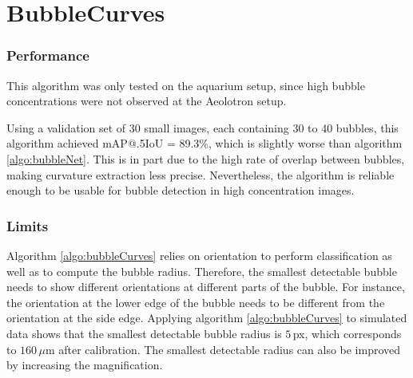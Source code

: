 			\section{BubbleCurves}\label{result_curves}
			
				\subsubsection{Performance}
				This algorithm was only tested on the aquarium setup, since high bubble concentrations were not observed at the Aeolotron setup. 
				
				Using a validation set of 30 small images, each containing 30 to 40 bubbles, this algorithm achieved mAP@.5IoU = 89.3\%, which is slightly worse than algorithm \ref{algo:bubbleNet}. This is in part due to the high rate of overlap between bubbles, making curvature extraction less precise. 
				Nevertheless, the algorithm is reliable enough to be usable for bubble detection in high concentration images.					
				
				\subsubsection{Limits}
				Algorithm \ref{algo:bubbleCurves} relies on orientation to perform classification as well as to compute the bubble radius. Therefore, the smallest detectable bubble needs to show different orientations at different parts of the bubble. For instance, the orientation at the lower edge of the bubble needs to be different from the orientation at the side edge. Applying algorithm \ref{algo:bubbleCurves} to simulated data shows that the smallest detectable bubble radius is $5$\,px, which corresponds to $160 \, \mu$m after calibration. 
				The smallest detectable radius can also be improved by increasing the magnification. 
				
				
				
				
				
				
				
				
				
				
				